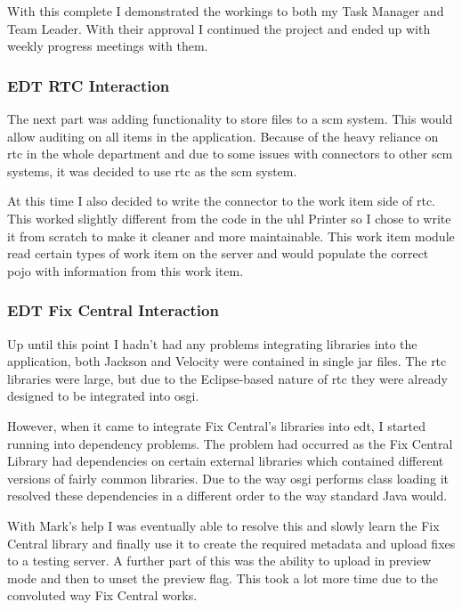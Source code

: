 \documentclass[a4paper,11pt]{report}
\begin{document}
With this complete I demonstrated the workings to both my Task Manager and Team Leader. With their
approval I continued the project and ended up with weekly progress meetings with them. \\

\subsubsection{EDT RTC Interaction}

The next part was adding functionality to store files to a \gls{scm} system. This would allow 
auditing on all items in the application. Because of the heavy reliance on \gls{rtc} in the whole
department and due to some issues with connectors to other \gls{scm} systems, it was decided to use
\gls{rtc} as the \gls{scm} system.

At this time I also decided to write the connector to the work item side of \gls{rtc}. This worked
slightly different from the code in the \gls{uhl} Printer so I chose to write it from scratch to
make it cleaner and more maintainable. This work item module read certain types of work item on the
server and would populate the correct \gls{pojo} with information from this work item. \\

\subsubsection{EDT Fix Central Interaction}

Up until this point I hadn't had any problems integrating libraries into the application, both
Jackson and Velocity were contained in single jar files. The \gls{rtc} libraries were large, but
due to the Eclipse-based nature of \gls{rtc} they were already designed to be integrated into 
\gls{osgi}.

However, when it came to integrate Fix Central's libraries into \gls{edt}, I started running into
dependency problems. The problem had occurred as the Fix Central Library had dependencies on
certain external libraries which contained different versions of fairly common libraries. Due to
the way \gls{osgi} performs class loading it resolved these dependencies in a different order to
the way standard Java would.

With Mark's help I was eventually able to resolve this and slowly learn the Fix Central library and
finally use it to create the required metadata and upload fixes to a testing server. A further part
of this was the ability to upload in preview mode and then to unset the preview flag. This took a
lot more time due to the convoluted way Fix Central works. \\
\end{document}
